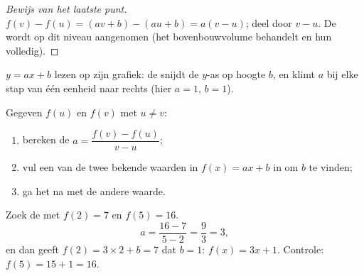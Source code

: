 \begin{proof}[Bewijs van het laatste punt]
$f(v) - f(u) = (av + b) - (au + b) = a(v - u)$; deel door $v - u$. De  wordt
op dit niveau aangenomen (het bovenbouwvolume behandelt  en hun
 volledig).
\end{proof}

\begin{omfigure}

{\small $y = ax + b$ lezen op zijn grafiek: de  snijdt de $y$-as op hoogte
$b$, en klimt $a$ bij elke stap van één eenheid naar rechts (hier $a = 1$,
$b = 1$).}
\end{omfigure}

\begin{method}\label{met:g9:linfunc:findaffine}
Gegeven $f(u)$ en $f(v)$ met $u \neq v$:
\begin{enumerate}
  \item bereken de  $a = \dfrac{f(v) - f(u)}{v - u}$;
  \item vul een van de twee bekende waarden in $f(x) = ax + b$ in om $b$ te
        vinden;
  \item ga het na met de andere waarde.
\end{enumerate}
\end{method}

\begin{example}\label{ex:g9:linfunc:findaffine}
Zoek de  met $f(2) = 7$ en $f(5) = 16$.
\[
a = \frac{16 - 7}{5 - 2} = \frac93 = 3 ,
\]
en dan geeft $f(2) = 3 \times 2 + b = 7$ dat $b = 1$: $f(x) = 3x + 1$. Controle:
$f(5) = 15 + 1 = 16$.
\end{example}


